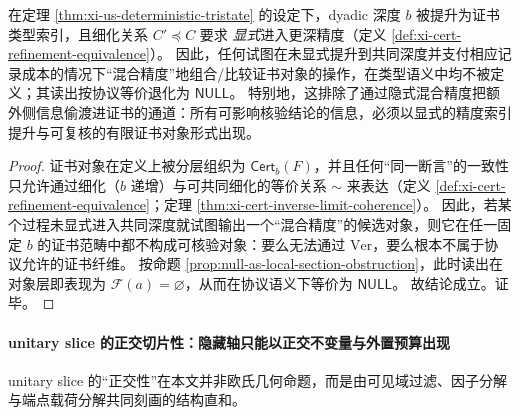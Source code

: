 \begin{corollary}\label{cor:xi-precision-type-no-leakage}
在定理 \ref{thm:xi-us-deterministic-tristate} 的设定下，dyadic 深度 \(b\) 被提升为证书类型索引，且细化关系 \(C'\preceq C\) 要求 \emph{显式}进入更深精度（定义 \ref{def:xi-cert-refinement-equivalence}）。
因此，任何试图在未显式提升到共同深度并支付相应记录成本的情况下“混合精度”地组合/比较证书对象的操作，在类型语义中均不被定义；其读出按协议等价退化为 \(\mathsf{NULL}\)。
特别地，这排除了通过隐式混合精度把额外侧信息偷渡进证书的通道：所有可影响核验结论的信息，必须以显式的精度索引提升与可复核的有限证书对象形式出现。
\end{corollary}

\begin{proof}
证书对象在定义上被分层组织为 \(\mathsf{Cert}_b(F)\)，并且任何“同一断言”的一致性只允许通过细化（\(b\) 递增）与可共同细化的等价关系 \(\sim\) 来表达（定义 \ref{def:xi-cert-refinement-equivalence}；定理 \ref{thm:xi-cert-inverse-limit-coherence}）。
因此，若某个过程未显式进入共同深度就试图输出一个“混合精度”的候选对象，则它在任一固定 \(b\) 的证书范畴中都不构成可核验对象：要么无法通过 \(\mathrm{Ver}\)，要么根本不属于协议允许的证书纤维。
按命题 \ref{prop:null-as-local-section-obstruction}，此时读出在对象层即表现为 \(\mathscr F(a)=\varnothing\)，从而在协议语义下等价为 \(\mathsf{NULL}\)。
故结论成立。证毕。
\end{proof}

\paragraph{unitary slice 的正交切片性：隐藏轴只能以正交不变量与外置预算出现}
unitary slice 的“正交性”在本文并非欧氏几何命题，而是由可见域过滤、因子分解与端点载荷分解共同刻画的结构直和。

